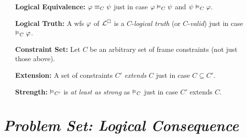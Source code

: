 \documentclass[a4paper, 11pt]{article} %
\begin{document}
\begin{enumerate}[leftmargin=1.2in]
  \item[\bf Logical Equivalence:] $\metaA \MLequiv[C] \metaB$ just in case $\metaA \MLmodels[C] \metaB$ and $\metaB \MLmodels[C] \metaA$.
  \item[\bf Logical Truth:] A wfs $\metaA$ of $\ML$ is a $C$-\textit{logical truth} (or $C$-\textit{valid}) just in case $\MLmodels[C] \metaA$.
  \item[\bf Constraint Set:] Let $C$ be an arbitrary set of frame constraints (not just those above).
  \item[\bf Extension:] A set of constraints $C'$ \textit{extends} $C$ just in case $C \subseteq C'$. 
  \item[\bf Strength:] $\MLmodels[C']$ is \textit{at least as strong} as $\MLmodels[C]$ just in case $C'$ extends $C$. 
\end{enumerate}




\section*{\it Problem Set: Logical Consequence}
\end{document}
